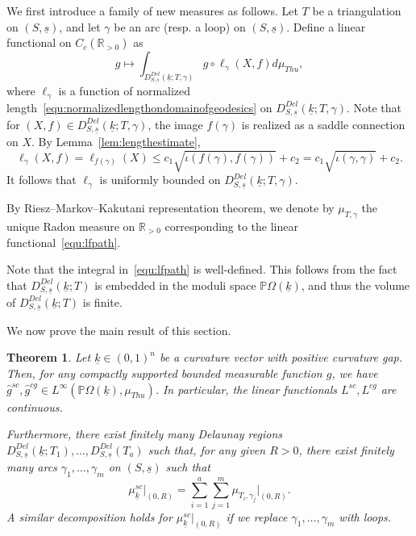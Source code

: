 \documentclass{compositio}
\numberwithin{equation}{section}
\numberwithin{figure}{section}
\theoremstyle{definition}
\theoremstyle{plain}
\newtheorem{theorem}[definition]{Theorem}
\begin{document}
{We first introduce a family of new measures as follows.
Let $T$ be a triangulation on $(S,\underline{s})$, and let $\gamma$ be an arc (resp. a loop) on $(S,\underline{s})$. 
Define a linear functional on $C_c(\mathbb{R}_{>0})$ as
\begin{equation}\label{equ:lfpath}
    g \mapsto \int_{D_{S,\underline{s}}^{Del}(\underline{k};T, \gamma)}g\circ\ell _{\gamma}(X,f)d\mu_{Thu},
\end{equation}
where $\ell_{\gamma}$ is a function of normalized length~\eqref{equ:normalizedlengthondomainofgeodesics} on $D_{S,\underline{s}}^{Del}(\underline{k};T, \gamma)$. Note that for $(X,f)\in D_{S,\underline{s}}^{Del}(\underline{k};T,\gamma)$, the image $f(\gamma)$ is realized as a saddle connection on $X$. By Lemma~\ref{lem:lengthestimate},
$$
\ell_\gamma(X,f)=\ell_{f(\gamma)}(X)\le c_1\sqrt{\iota\left(f(\gamma),f(\gamma)\right)}+c_2 = c_1\sqrt{\iota(\gamma,\gamma)}+c_2.
$$
It follows that $\ell_\gamma$ is uniformly bounded on $D_{S,\underline{s}}^{Del}(\underline{k};T,\gamma)$.

By Riesz–Markov–Kakutani representation theorem, we denote by $\mu_{T,\gamma}$ the unique Radon measure on $\mathbb{R}_{>0}$ corresponding to the linear functional~\eqref{equ:lfpath}.

Note that the integral in~\eqref{equ:lfpath} is well-defined. This follows from the fact that $D_{S,\underline{s}}^{Del}(\underline{k};T)$ is embedded in the moduli space $\mathbb{P}\Omega(\underline{k})$, and thus the volume of $D_{S,\underline{s}}^{Del}(\underline{k};T)$ is finite.

We now prove the main result of this section.

\begin{theorem}\label{thm:integrabilityandfinitedecomp}
Let $\underline{k}\in (0,1)^n$ be a curvature vector with positive curvature gap. Then, for any compactly supported bounded measurable function $g$, we have $\hat{g}^{sc}, \hat{g}^{cg} \in L^{\infty}(\mathbb{P}\Omega(\underline{k}), \mu_{Thu})$. In particular, the linear functionals $L^{sc}, L^{cg}$ are continuous.

Furthermore, there exist finitely many Delaunay regions $D_{S,\underline{s}}^{Del}(\underline{k};T_1), \ldots, D_{S,\underline{s}}^{Del}(T_a)$ such that, for any given $R > 0$, there exist finitely many arcs $\gamma_1, \ldots, \gamma_m$ on $(S, \underline{s})$ such that
\begin{equation}
    \mu^{sc}_{\underline{k}}\Big|_{(0, R)}= \sum_{i=1}^{a} \sum_{j=1}^{m} \mu_{T_i, \gamma_j}\Big|_{(0, R)}.
\end{equation}
A similar decomposition holds for $\mu^{sc}_{\underline{k}}\Big|_{(0, R)}$ if we replace $\gamma_1, \ldots, \gamma_m$ with loops.
\end{theorem}

}
\end{document}
